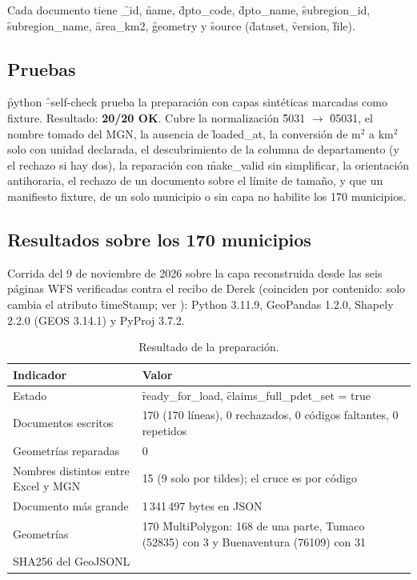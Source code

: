Cada documento tiene \f{\_id}, \f{name}, \f{dpto\_code}, \f{dpto\_name}, \f{subregion\_id}, \f{subregion\_name}, \f{area\_km2}, \f{geometry} y \f{source} (\f{dataset}, \f{version}, \f{file}).

\subsection{Pruebas}

\f{python}  \f{--self-check} prueba la preparación con capas sintéticas marcadas como fixture. Resultado: \textbf{20/20 OK}. Cubre la normalización \f{5031} $\rightarrow$ \f{05031}, el nombre tomado del MGN, la ausencia de \f{loaded\_at}, la conversión de m$^2$ a km$^2$ solo con unidad declarada, el descubrimiento de la columna de departamento (y el rechazo si hay dos), la reparación con \f{make\_valid} sin simplificar, la orientación antihoraria, el rechazo de un documento sobre el límite de tamaño, y que un manifiesto fixture, de un solo municipio o sin capa no habilite los 170 municipios.

\subsection{Resultados sobre los 170 municipios}

Corrida del 9 de noviembre de 2026 sobre la capa reconstruida desde las seis páginas WFS verificadas contra el recibo de Derek (coinciden por contenido: solo cambia el atributo \f{timeStamp}; ver ): Python 3.11.9, GeoPandas 1.2.0, Shapely 2.2.0 (GEOS 3.14.1) y PyProj 3.7.2.

\begin{table}[htbp]
\centering\small
\caption{Resultado de la preparación.}
\begin{tabularx}{\textwidth}{@{}P{5.6cm} L@{}}
\toprule
Indicador & Valor \\
\midrule
Estado & \f{ready\_for\_load}, \f{claims\_full\_pdet\_set = true} \\
Documentos escritos & 170 (170 líneas), 0 rechazados, 0 códigos faltantes, 0 repetidos \\
Geometrías reparadas & 0 \\
Nombres distintos entre Excel y MGN & 15 (9 solo por tildes); el cruce es por código \\
Documento más grande & 1\,341\,497 bytes en JSON \\
Geometrías & 170 \f{MultiPolygon}: 168 de una parte, Tumaco (52835) con 3 y Buenaventura (76109) con 31 \\
SHA256 del GeoJSONL &  \\
\bottomrule
\end{tabularx}
\end{table}

